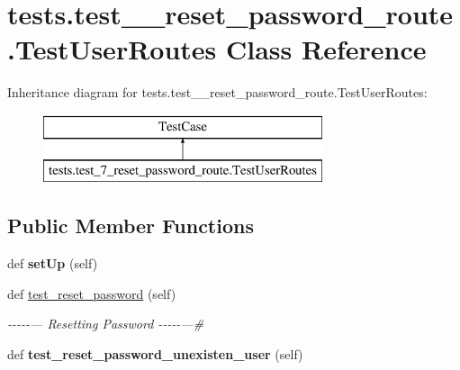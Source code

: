 \hypertarget{classtests_1_1test__7__reset__password__route_1_1_test_user_routes}{}\section{tests.\+test\+\_\+\_\+reset\+\_\+password\+\_\+route.\+Test\+User\+Routes Class Reference}
\label{classtests_1_1test__7__reset__password__route_1_1_test_user_routes}
Inheritance diagram for tests.\+test\+\_\+\_\+reset\+\_\+password\+\_\+route.\+Test\+User\+Routes\+:\begin{figure}[H]
\begin{center}
\leavevmode
\includegraphics[height=2.000000cm]{classtests_1_1test__7__reset__password__route_1_1_test_user_routes}
\end{center}
\end{figure}
\subsection*{Public Member Functions}
\begin{DoxyCompactItemize}
\item 
\mbox{\label{classtests_1_1test__7__reset__password__route_1_1_test_user_routes_ae830aca1baab5e540160786a9943d935}} 
def {\bfseries set\+Up} (self)
\item 
\mbox{\label{classtests_1_1test__7__reset__password__route_1_1_test_user_routes_a0612de233e6afd95db7c1b6661d1b523}} 
def \hyperlink{classtests_1_1test__7__reset__password__route_1_1_test_user_routes_a0612de233e6afd95db7c1b6661d1b523}{test\+\_\+reset\+\_\+password} (self)
\begin{DoxyCompactList}\small\item\em -\/-\/-\/-\/-\/--- Resetting Password -\/-\/-\/-\/-\/---\# \end{DoxyCompactList}\item 
\mbox{\label{classtests_1_1test__7__reset__password__route_1_1_test_user_routes_aaf35685e09e7da11e134363507ddd24a}} 
def {\bfseries test\+\_\+reset\+\_\+password\+\_\+unexisten\+\_\+user} (self)
\end{DoxyCompactItemize}
